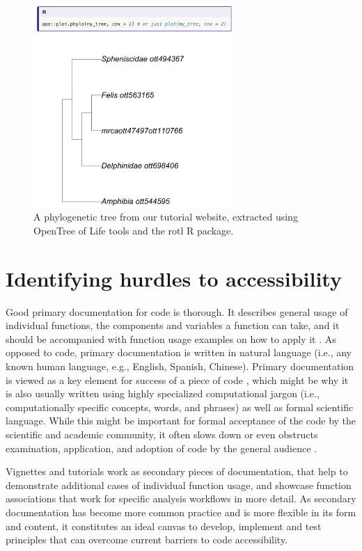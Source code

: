 \documentclass[12pt]{article}
\begin{document}
\begin{figure}
\begin{center}
\includegraphics[width=3in]{fig-tree.png}
\end{center}
\caption{A phylogenetic tree from our tutorial website, extracted using OpenTree of Life tools and the rotl R package. \label{fig:tree}}
\end{figure}

\section*{Identifying hurdles to accessibility}
\label{sec:identifying}

Good primary documentation for code is thorough. It describes general usage of individual functions,
the components and variables a function can take, and it should be accompanied with
function usage examples on how to apply it \citep{karimzadeh2018top}.
As opposed to code, primary documentation is written in natural language (i.e.,
any known human language, e.g., English, Spanish, Chinese).
Primary documentation is viewed as a key element for success of a piece of code
\citep{karimzadeh2018top},
which might be why it is also usually written using highly specialized computational jargon (i.e., computationally specific concepts,
words, and phrases) as well as formal scientific language.
While this might be important for formal acceptance of the code by the scientific
and academic community, it often slows down or even
obstructs examination, application, and adoption of code by the general audience \citep{ball2017its}.

Vignettes and tutorials work as secondary pieces of documentation, that help to demonstrate
additional cases of individual function usage, and showcase function associations
that work for specific analysis workflows in more detail.
As secondary documentation has become more common practice and is more flexible
in its form and content, it constitutes an ideal canvas to develop, implement and
test principles that can overcome current barriers to code accessibility.
\end{document}
